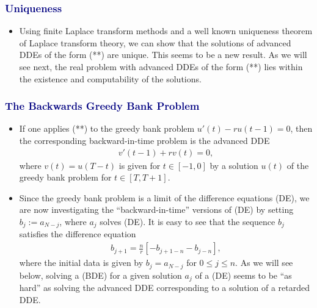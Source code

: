 \documentclass[landscape, a0]{sciposter}
\begin{document}
\begin{multicols}{4}
 \subsubsection*{\textcolor{navy}{Uniqueness}}
\begin{itemize}
 \item Using finite Laplace transform methods and a well known uniqueness theorem of Laplace transform theory, we can show that the solutions of advanced DDEs of the form (**) are unique. This seems to be a new result. As we will see next, the real problem with advanced DDEs of the form (**) lies within the existence and computability of the solutions.
 \end{itemize}
%
\subsubsection*{\textcolor{navy}{The Backwards Greedy Bank Problem}}
\begin{itemize}
 \item If one applies (**) to the greedy bank problem $u'(t) - ru(t-1)=0$, then the corresponding backward-in-time problem is the advanced DDE
     \begin{align} 
         v'(t-1)+ rv(t) = 0, \tag{BGB}
         \end{align}
    where $v(t)=u(T-t)$ is given for $t\in[-1,0]$ by a solution $u(t)$ of the greedy bank problem for $t\in [T,T+1]$.     
      \item Since the greedy bank problem is a limit of the difference equations (DE), we are now investigating the ``backward-in-time'' versions of (DE) by setting $b_j := a_{N-j}$, where $a_j$ solves (DE). It is easy to see that the sequence $b_j$ satisfies the difference equation
 \begin{align}
         b_{j+1}=\frac{n}{r}[-b_{j+1-n}-b_{j-n}], \tag{BDE}
         \end{align}
         where the initial data is given by $b_j = a_{N-j}$ for $0\le j\le n$. As we will see below, solving a (BDE) for a given solution $a_j$ of a (DE) seems to be ``as hard'' as solving the advanced DDE corresponding to a solution of a retarded DDE.
  \end{itemize}

\begin{figure} [H]

\hspace{.1cm}
\hspace{.1cm}
\hspace{.1cm}
\end{figure} 


\end{multicols}
\end{document}
